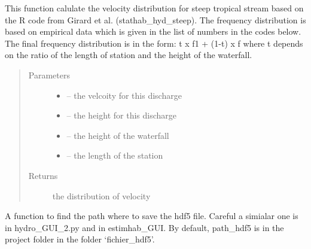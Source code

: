 \documentclass[letterpaper,10pt,english]{sphinxmanual}
\begin{document}
\begin{fulllineitems}
\begin{fulllineitems}
\label{\detokenize{index:src.stathab_c.Stathab.dist_v_trop}}
This function calulate the velocity distribution for steep tropical stream based on the R code from
Girard et al. (stathab\_hyd\_steep). The frequency distribution is based on empirical data which
is given in the list of numbers in the codes below. The final frequency distribution is in the form:
t x f1 + (1-t) x f where t depends on the ratio of the length of station and the height of the waterfall.
\begin{quote}\begin{description}
\item[{Parameters}] \leavevmode\begin{itemize}
\item {} 
 -- the velcoity for this discharge

\item {} 
 -- the height for this discharge

\item {} 
 -- the height of the waterfall

\item {} 
 -- the length of the station

\end{itemize}

\item[{Returns}] \leavevmode
the distribution of velocity

\end{description}\end{quote}

\end{fulllineitems}


\begin{fulllineitems}
\label{\detokenize{index:src.stathab_c.Stathab.find_path_hdf5_stat}}
A function to find the path where to save the hdf5 file. Careful a simialar one is in hydro\_GUI\_2.py
and in estimhab\_GUI. By default,
path\_hdf5 is in the project folder in the folder `fichier\_hdf5'.

\end{fulllineitems}


\end{fulllineitems}
\end{document}
